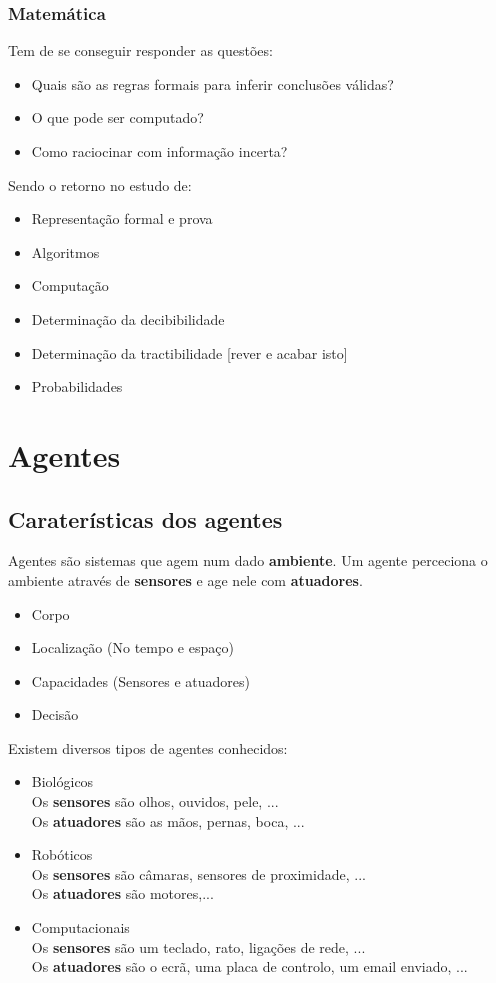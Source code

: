 \documentclass[]{report}
\begin{document}
\subsection{Matemática}
Tem de se conseguir responder as questões:
\begin{itemize}
\item Quais são as regras formais para inferir conclusões válidas?
\item O que pode ser computado?
\item Como raciocinar com informação incerta?
\end{itemize}
Sendo o retorno no estudo de:
\begin{itemize}
\item Representação formal e prova
\item Algoritmos
\item Computação
\item Determinação da decibibilidade
\item Determinação da tractibilidade [rever e acabar isto]
\item Probabilidades
\end{itemize}
\chapter{Agentes}
\section{Caraterísticas dos agentes}
Agentes são sistemas que agem num dado \textbf{ambiente}.
Um agente perceciona o ambiente através de \textbf{sensores} e age nele com \textbf{atuadores}.
\begin{itemize}
\item Corpo
\item Localização (No tempo e espaço)
\item Capacidades (Sensores e atuadores)
\item Decisão
\end{itemize}
Existem diversos tipos de agentes conhecidos:
\begin{itemize}
\item Biológicos\\
Os \textbf{sensores} são olhos, ouvidos, pele, ...\\
Os \textbf{atuadores} são as mãos, pernas, boca, ...
\item Robóticos\\
Os \textbf{sensores} são câmaras, sensores de proximidade, ...\\
Os \textbf{atuadores} são motores,...
\item Computacionais\\
Os \textbf{sensores} são um teclado, rato, ligações de rede, ...\\
Os \textbf{atuadores} são o ecrã, uma placa de controlo, um email enviado, ...
\end{itemize}
\end{document}
